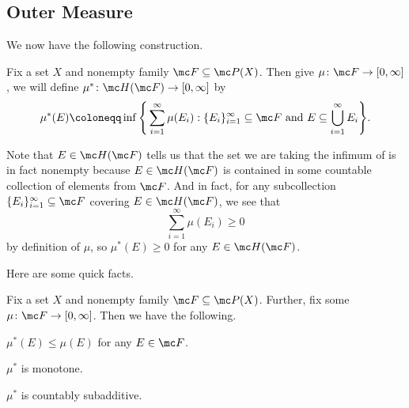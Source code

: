 \documentclass[../notes.tex]{subfiles}
\begin{document}
\subsection{Outer Measure}
We now have the following construction.
\begin{notation}
	Fix a set $X$ and nonempty family $\mc F\subseteq\mc P(X)$. Then give $\mu\colon\mc F\to[0,\infty]$, we will define $\mu^*\colon\mc H(\mc F)\to[0,\infty]$ by
	\[\mu^*(E)\coloneqq\inf\Bigg\{\sum_{i=1}^\infty\mu(E_i):\{E_i\}_{i=1}^\infty\subseteq\mc F\text{ and }E\subseteq\bigcup_{i=1}^\infty E_i\Bigg\}.\]
\end{notation}
\begin{remark}
	Note that $E\in\mc H(\mc F)$ tells us that the set we are taking the infimum of is in fact nonempty because $E\in\mc H(\mc F)$ is contained in some countable collection of elements from $\mc F$. And in fact, for any subcollection $\{E_i\}_{i=1}^\infty\subseteq\mc F$ covering $E\in\mc H(\mc F)$, we see that
	\[\sum_{i=1}^\infty\mu(E_i)\ge0\]
	by definition of $\mu$, so $\mu^*(E)\ge0$ for any $E\in\mc H(\mc F)$.
\end{remark}
Here are some quick facts.
\begin{lemma} \label{lem:hered-measure-facts}
	Fix a set $X$ and nonempty family $\mc F\subseteq\mc P(X)$. Further, fix some $\mu\colon\mc F\to[0,\infty]$. Then we have the following.
	\begin{listalph}
		\item $\mu^*(E)\le\mu(E)$ for any $E\in\mc F$.
		\item $\mu^*$ is monotone.
		\item $\mu^*$ is countably subadditive.
	\end{listalph}
\end{lemma}
\end{document}
